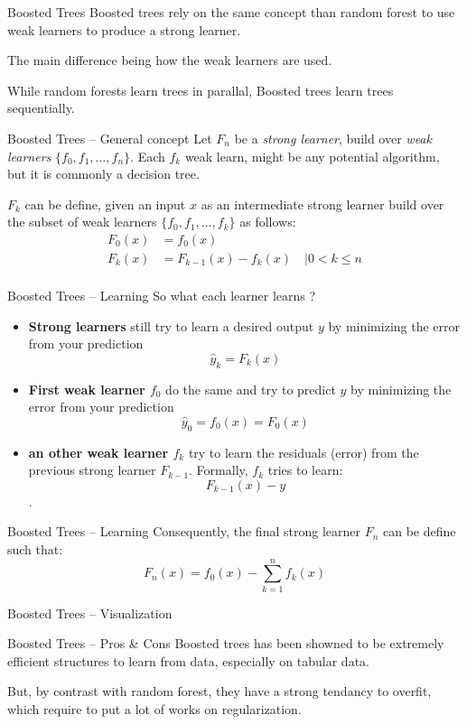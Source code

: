 \begin{frame}{Boosted Trees}
    Boosted trees rely on the same concept than random forest to use weak learners to produce a strong learner.

    The main difference being how the weak learners are used.

    While random forests learn trees in parallal, Boosted trees learn trees sequentially.
\end{frame}

\begin{frame}{Boosted Trees -- General concept}
Let $F_n$ be a \textit{strong learner}, build over \textit{weak learners} $\{f_0, f_1,\dots , f_n\}$. Each $f_k$ weak learn, might be any potential algorithm, but it is commonly a decision tree. 

$F_k$ can be define, given an input $x$ as an intermediate strong learner build over the subset of weak learners $\{f_0, f_1, \dots , f_k\}$ as follows:
\begin{align*}
    F_0(x) &= f_0(x)\\ 
    F_k(x) &= F_{k-1}(x) - f_k(x) \quad | 0 < k \leq n\\ 
\end{align*}
\end{frame}

\begin{frame}{Boosted Trees -- Learning}
    So what each learner learns ?
    \begin{itemize}
        \item \textbf{Strong learners} still try to learn a desired output $y$ by minimizing the error from your prediction $$\hat{y}_k = F_k(x)$$
        \item \textbf{First weak learner $f_0$} do the same and try to predict $y$ by minimizing the error from your prediction $$\hat{y}_0 = f_0(x) = F_0(x)$$
        \item \textbf{an other weak learner $f_k$} try to learn the residuals (error) from the previous strong learner $F_{k-1}$. Formally, $f_k$ tries to learn:$$F_{k-1}(x) - y$$. 
    \end{itemize}

\end{frame}

\begin{frame}{Boosted Trees -- Learning}
   Consequently, the final strong learner $F_n$ can be define such that:
   $$F_n(x) = f_0(x) - \sum_{k=1}^{n}f_k(x)$$
\end{frame}

\begin{frame}{Boosted Trees -- Visualization}
\end{frame}

\begin{frame}{Boosted Trees -- Pros \& Cons}
    Boosted trees has been showned to be extremely efficient structures to learn from data, especially on tabular data.

    But, by contrast with random forest, they have a strong tendancy to overfit, which require to put a lot of works on regularization.
\end{frame}